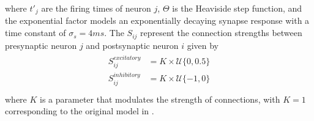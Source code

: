 where $t'_j$ are the firing times of neuron $j$, $\Theta$ is the Heaviside step function, and the exponential factor models an exponentially decaying synapse response with a time constant of $\sigma_s = 4 ms$. 
The $S_{ij}$ represent the connection strengths between presynaptic neuron $j$ and postsynaptic neuron $i$ given by
\begin{align}
 \begin{split}
  S_{ij}^{excitatory} &= K \times \mathcal{U}\{0,0.5 \} \\
  S_{ij}^{inhibitory} &= K \times \mathcal{U}\{-1,0 \}  \\
 \end{split}
\end{align}
where $K$ is a parameter that modulates the strength of connections, with $K=1$ corresponding to the original model in \citet{izhikevich2003}. 

